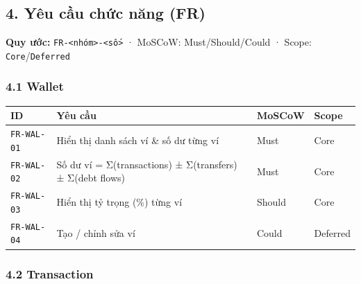 \documentclass[11pt,a4paper]{article}
\newcounter{none}
\begin{document}
\newpage

\subsection{4. Yêu cầu chức năng (FR)}\label{yuxeau-cux1ea7u-chux1ee9c-nux103ng-fr}

\textbf{Quy ước:}
\texttt{FR-\textless{}nhóm\textgreater{}-\textless{}số\textgreater{}} ·
MoSCoW: Must/Should/Could · Scope: \texttt{Core}/\texttt{Deferred}

\subsubsection{4.1 Wallet}\label{wallet}

{\def\LTcaptype{none}
\begin{longtable}[]{@{}
  >{\raggedright\arraybackslash}p{}
  >{\raggedright\arraybackslash}p{}
  >{\centering\arraybackslash}p{}
  >{\centering\arraybackslash}p{}@{}}
\toprule\noalign{}
\begin{minipage}[b]{\linewidth}\raggedright
ID
\end{minipage} & \begin{minipage}[b]{\linewidth}\raggedright
Yêu cầu
\end{minipage} & \begin{minipage}[b]{\linewidth}\raggedright
MoSCoW
\end{minipage} & \begin{minipage}[b]{\linewidth}\raggedright
Scope
\end{minipage} \\
\midrule\noalign{}
\endhead
\bottomrule\noalign{}
\endlastfoot
\texttt{FR-WAL-01} & Hiển thị danh sách ví \& số dư từng ví & Must & Core \\ 
\texttt{FR-WAL-02} & Số dư ví = Σ(transactions) ± Σ(transfers) ± Σ(debt flows) & Must & Core \\ 
\texttt{FR-WAL-03} & Hiển thị tỷ trọng (\%) từng ví & Should & Core \\ 
\texttt{FR-WAL-04} & Tạo / chỉnh sửa ví & Could & Deferred \\
\end{longtable}
}

\subsubsection{4.2 Transaction}\label{transaction}
\end{document}
